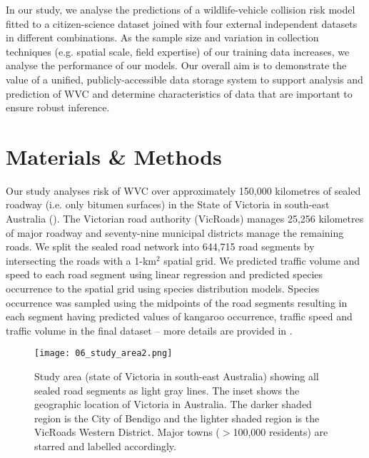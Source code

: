 In our study, we analyse the predictions of a wildlife-vehicle collision risk model fitted to a citizen-science dataset joined with four external independent datasets in different combinations. As the sample size and variation in collection techniques (e.g. spatial scale, field expertise) of our training data increases, we analyse the performance of our models. Our overall aim is to demonstrate the value of a unified, publicly-accessible data storage system to support analysis and prediction of WVC and determine characteristics of data that are important to ensure robust inference.

\section{Materials \& Methods}

Our study analyses risk of WVC over approximately 150,000 kilometres of sealed roadway (i.e. only bitumen surfaces) in the State of Victoria in south-east Australia (). The Victorian road authority (VicRoads) manages 25,256 kilometres of major roadway and seventy-nine municipal districts manage the remaining roads. We split the sealed road network into 644,715 road segments by intersecting the roads with a 1-km$^2$ spatial grid. We predicted traffic volume and speed to each road segment using linear regression and predicted species occurrence to the spatial grid using species distribution models. Species occurrence was sampled using the midpoints of the road segments resulting in each segment having predicted values of kangaroo occurrence, traffic speed and traffic volume in the final dataset -- more details are provided in . 

\begin{figure*}[!t]
  \centering
  \texttt{[image: 06\_study\_area2.png]}
  \caption[Study area for model validation]{Study area (state of Victoria in south-east Australia) showing all sealed road segments as light gray lines. The inset shows the geographic location of Victoria in Australia. The darker shaded region is the City of Bendigo and the lighter shaded region is the VicRoads Western District. Major towns ($>$100,000 residents) are starred and labelled accordingly.}
  \label{val_study_area}
\end{figure*}


